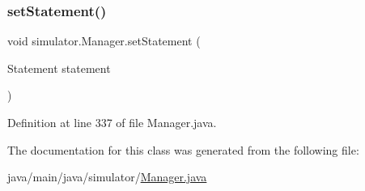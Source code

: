 \subsubsection{\texorpdfstring{set\+Statement()}{setStatement()}}
{\footnotesize\ttfamily void simulator.\+Manager.\+set\+Statement (\begin{DoxyParamCaption}\item[{Statement}]{statement }\end{DoxyParamCaption})}



Definition at line 337 of file Manager.\+java.



The documentation for this class was generated from the following file\+:\begin{DoxyCompactItemize}
\item 
java/main/java/simulator/\mbox{\hyperlink{_manager_8java}{Manager.\+java}}\end{DoxyCompactItemize}

